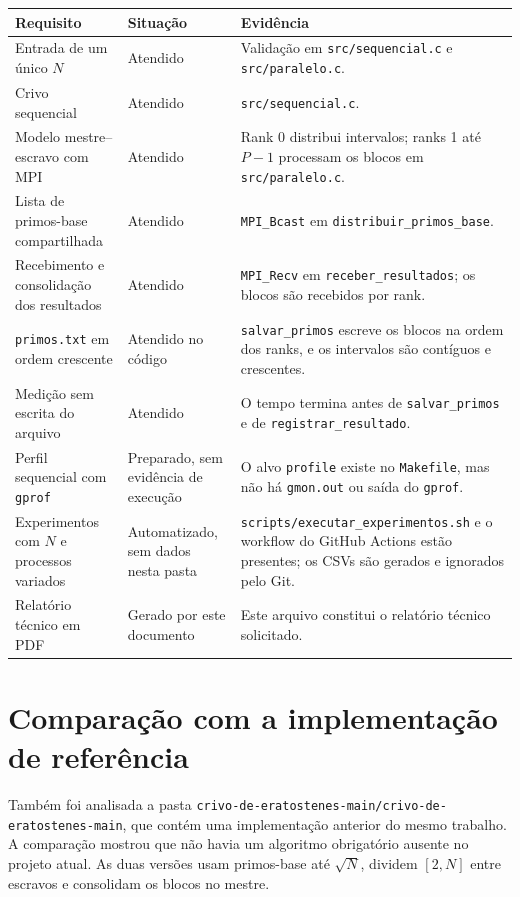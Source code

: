 \documentclass[12pt,a4paper]{article}
\begin{document}
\begin{longtable}{p{}p{}p{}}
\toprule
\textbf{Requisito} & \textbf{Situação} & \textbf{Evidência} \\
\midrule
\endhead
Entrada de um único \(N\) & Atendido & Validação em \texttt{src/sequencial.c} e \texttt{src/paralelo.c}. \\
Crivo sequencial & Atendido & \texttt{src/sequencial.c}. \\
Modelo mestre--escravo com MPI & Atendido & Rank 0 distribui intervalos; ranks 1 até \(P-1\) processam os blocos em \texttt{src/paralelo.c}. \\
Lista de primos-base compartilhada & Atendido & \texttt{MPI\_Bcast} em \texttt{distribuir\_primos\_base}. \\
Recebimento e consolidação dos resultados & Atendido & \texttt{MPI\_Recv} em \texttt{receber\_resultados}; os blocos são recebidos por rank. \\
\texttt{primos.txt} em ordem crescente & Atendido no código & \texttt{salvar\_primos} escreve os blocos na ordem dos ranks, e os intervalos são contíguos e crescentes. \\
Medição sem escrita do arquivo & Atendido & O tempo termina antes de \texttt{salvar\_primos} e de \texttt{registrar\_resultado}. \\
Perfil sequencial com \texttt{gprof} & Preparado, sem evidência de execução & O alvo \texttt{profile} existe no \texttt{Makefile}, mas não há \texttt{gmon.out} ou saída do \texttt{gprof}. \\
Experimentos com \(N\) e processos variados & Automatizado, sem dados nesta pasta & \texttt{scripts/executar\_experimentos.sh} e o workflow do GitHub Actions estão presentes; os CSVs são gerados e ignorados pelo Git. \\
Relatório técnico em PDF & Gerado por este documento & Este arquivo constitui o relatório técnico solicitado. \\
\bottomrule
\end{longtable}

\section{Comparação com a implementação de referência}

Também foi analisada a pasta
\texttt{crivo-de-eratostenes-main/crivo-de-eratostenes-main}, que contém uma
implementação anterior do mesmo trabalho. A comparação mostrou que não havia
um algoritmo obrigatório ausente no projeto atual. As duas versões usam
primos-base até \(\sqrt{N}\), dividem \([2,N]\) entre escravos e consolidam
os blocos no mestre.
\end{document}
